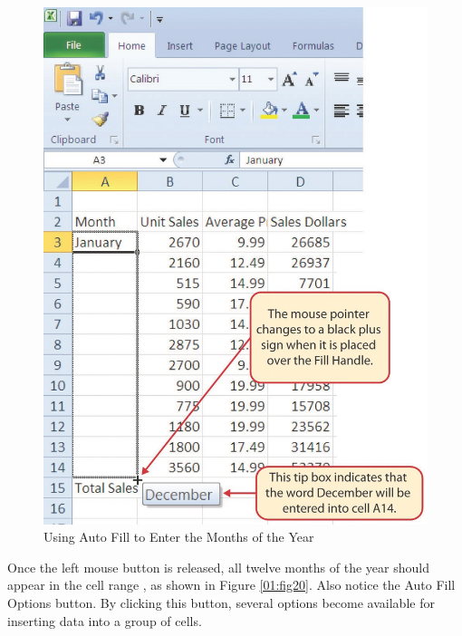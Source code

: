 \begin{figure}[H]
	\centering
	\includegraphics[width=\maxwidth{.95\linewidth}]{gfx/ch01_fig19}
	\caption{Using Auto Fill to Enter the Months of the Year}
	\label{01:fig19}
\end{figure}

Once the left mouse button is released, all twelve months of the year should appear in the cell range , as shown in Figure \ref{01:fig20}. Also notice the Auto Fill Options button. By clicking this button, several options become available for inserting data into a group of cells.

